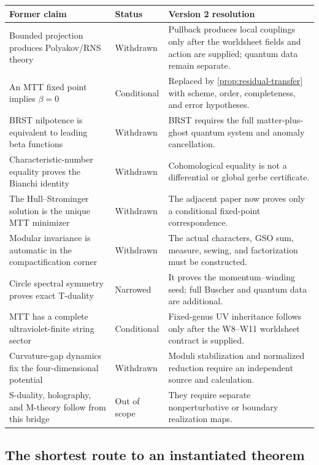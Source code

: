 \documentclass[11pt]{article}
\theoremstyle{definition}
\theoremstyle{remark}
\begin{document}
\begin{center}
\small
\begin{tabularx}{0.96\textwidth}{@{}p{}p{}X@{}}
\toprule
Former claim & Status & Version 2 resolution \\
\midrule
Bounded projection produces Polyakov/RNS theory & Withdrawn &
Pullback produces local couplings only after the worldsheet fields and action
are supplied; quantum data remain separate. \\
An MTT fixed point implies \(\beta=0\) & Conditional &
Replaced by \cref{prop:residual-transfer} with scheme, order, completeness,
and error hypotheses. \\
BRST nilpotence is equivalent to leading beta functions & Withdrawn &
BRST requires the full matter-plus-ghost quantum system and anomaly
cancellation. \\
Characteristic-number equality proves the Bianchi identity & Withdrawn &
Cohomological equality is not a differential or global gerbe certificate. \\
The Hull--Strominger solution is the unique MTT minimizer & Withdrawn &
The adjacent paper now proves only a conditional fixed-point correspondence. \\
Modular invariance is automatic in the compactification corner & Withdrawn &
The actual characters, GSO sum, measure, sewing, and factorization must be
constructed. \\
Circle spectral symmetry proves exact T-duality & Narrowed &
It proves the momentum--winding seed; full Buscher and quantum data are
additional. \\
MTT has a complete ultraviolet-finite string sector & Conditional &
Fixed-genus UV inheritance follows only after the W8--W11 worldsheet
contract is supplied. \\
Curvature-gap dynamics fix the four-dimensional potential & Withdrawn &
Moduli stabilization and normalized reduction require an independent source
and calculation. \\
S-duality, holography, and M-theory follow from this bridge & Out of scope &
They require separate nonperturbative or boundary realization maps. \\
\bottomrule
\end{tabularx}
\end{center}

\subsection{The shortest route to an instantiated theorem}
\end{document}
